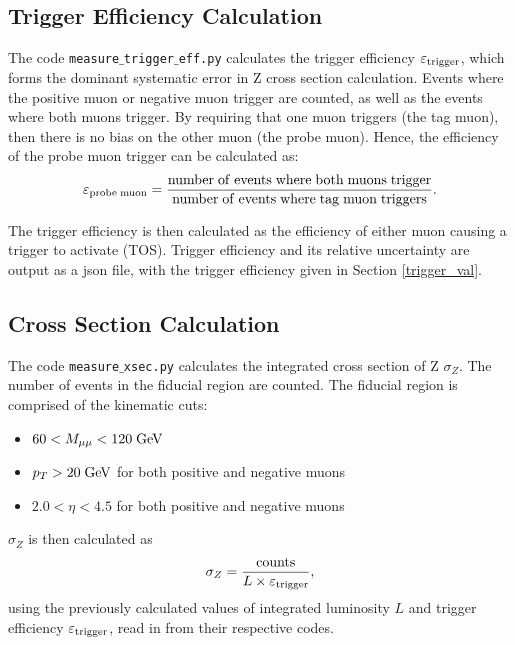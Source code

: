 \documentclass[a4paper]{article}
\begin{document}
\subsection{Trigger Efficiency Calculation} \label{sec: Z trigger efficiency}
The code \texttt{measure$\_$trigger$\_$eff.py} calculates the trigger efficiency $\varepsilon_{\rm trigger}$, which forms the dominant systematic error in Z cross section calculation. 
Events where the positive muon or negative muon trigger are counted, as well as the events where both muons trigger. 
By requiring that one muon triggers (the tag muon), then there is no bias on the other muon (the probe muon). Hence, the efficiency of the probe muon trigger can be calculated as:
\begin{equation}
{\varepsilon}_{{\rm probe \;  muon}} = \frac{{\rm number \; of \; events \; where \; both \; muons \; trigger}}{{\rm number \; of \; events \; where \; tag \; muon \; triggers}}.
\end{equation}

The trigger efficiency is then calculated as the efficiency of either muon causing a trigger to activate (TOS).
Trigger efficiency and its relative uncertainty are output as a json file, with the trigger efficiency given in Section \ref{trigger_val}.

\subsection{Cross Section Calculation} \label{sec: Z xsec}
The code \texttt{measure$\_$xsec.py} calculates the integrated cross section of Z $\sigma_Z$.
The number of events in the fiducial region are counted. The fiducial region is comprised of the kinematic cuts:

\begin{itemize}
  \item $60 < M_{\mu\mu} < 120 \; {\rm GeV}$ 
  \item $p_T > 20 \; {\rm GeV}$ for both positive and negative muons
  \item $2.0 < \eta < 4.5$ for both positive and negative muons
\end{itemize}

$\sigma_Z$ is then calculated as
\begin{equation}
\sigma_Z = \frac{{\rm counts}}{L \times {\varepsilon_{\rm trigger}}},
\end{equation}
using the previously calculated values of integrated luminosity $L$ and trigger efficiency $\varepsilon_{\rm trigger}$, read in from their respective codes.
\end{document}
